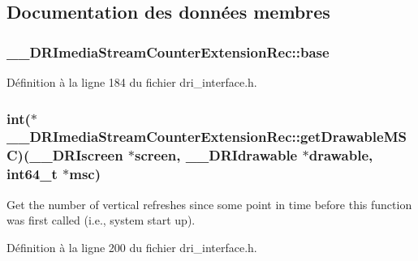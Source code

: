 \subsection{Documentation des données membres}
\hypertarget{struct_____d_r_imedia_stream_counter_extension_rec_a042c5ddf263000434a369b5da09efacc}{
\subsubsection[{base}]{ \-\_\-\-\_\-\-D\-R\-Imedia\-Stream\-Counter\-Extension\-Rec\-::base}}\label{struct_____d_r_imedia_stream_counter_extension_rec_a042c5ddf263000434a369b5da09efacc}


Définition à la ligne 184 du fichier dri\-\_\-interface.\-h.

\hypertarget{struct_____d_r_imedia_stream_counter_extension_rec_a937928e0af1fad374769623dfaf5e84b}{
\subsubsection[{get\-Drawable\-M\-S\-C}]{\setlength{\rightskip}{0pt plus 5cm}int($\ast$ \-\_\-\-\_\-\-D\-R\-Imedia\-Stream\-Counter\-Extension\-Rec\-::get\-Drawable\-M\-S\-C)({\bf \-\_\-\-\_\-\-D\-R\-Iscreen} $\ast$screen, {\bf \-\_\-\-\_\-\-D\-R\-Idrawable} $\ast$drawable, int64\-\_\-t $\ast$msc)}}\label{struct_____d_r_imedia_stream_counter_extension_rec_a937928e0af1fad374769623dfaf5e84b}
Get the number of vertical refreshes since some point in time before this function was first called (i.\-e., system start up). 

Définition à la ligne 200 du fichier dri\-\_\-interface.\-h.

